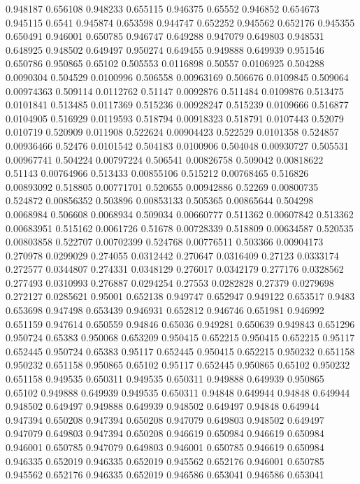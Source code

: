 0.948187 0.656108
0.948233 0.655115
0.946375 0.65552
0.946852 0.654673
0.945115 0.6541
0.945874 0.653598
0.944747 0.652252
0.945562 0.652176
0.945355 0.650491
0.946001 0.650785
0.946747 0.649288
0.947079 0.649803
0.948531 0.648925
0.948502 0.649497
0.950274 0.649455
0.949888 0.649939
0.951546 0.650786
0.950865 0.65102
0.505553 0.0116898
0.50557 0.0106925
0.504288 0.0090304
0.504529 0.0100996
0.506558 0.00963169
0.506676 0.0109845
0.509064 0.00974363
0.509114 0.0112762
0.51147 0.0092876
0.511484 0.0109876
0.513475 0.0101841
0.513485 0.0117369
0.515236 0.00928247
0.515239 0.0109666
0.516877 0.0104905
0.516929 0.0119593
0.518794 0.00918323
0.518791 0.0107443
0.52079 0.010719
0.520909 0.011908
0.522624 0.00904423
0.522529 0.0101358
0.524857 0.00936466
0.52476 0.0101542
0.504183 0.0100906
0.504048 0.00930727
0.505531 0.00967741
0.504224 0.00797224
0.506541 0.00826758
0.509042 0.00818622
0.51143 0.00764966
0.513433 0.00855106
0.515212 0.00768465
0.516826 0.00893092
0.518805 0.00771701
0.520655 0.00942886
0.52269 0.00800735
0.524872 0.00856352
0.503896 0.00853133
0.505365 0.00865644
0.504298 0.0068984
0.506608 0.0068934
0.509034 0.00660777
0.511362 0.00607842
0.513362 0.00683951
0.515162 0.0061726
0.51678 0.00728339
0.518809 0.00634587
0.520535 0.00803858
0.522707 0.00702399
0.524768 0.00776511
0.503366 0.00904173
0.270978 0.0299029
0.274055 0.0312442
0.270647 0.0316409
0.27123 0.0333174
0.272577 0.0344807
0.274331 0.0348129
0.276017 0.0342179
0.277176 0.0328562
0.277493 0.0310993
0.276887 0.0294254
0.27553 0.0282828
0.27379 0.0279698
0.272127 0.0285621
0.95001 0.652138
0.949747 0.652947
0.949122 0.653517
0.9483 0.653698
0.947498 0.653439
0.946931 0.652812
0.946746 0.651981
0.946992 0.651159
0.947614 0.650559
0.94846 0.65036
0.949281 0.650639
0.949843 0.651296
0.950724 0.65383
0.950068 0.653209
0.950415 0.652215
0.950415 0.652215
0.95117 0.652445
0.950724 0.65383
0.95117 0.652445
0.950415 0.652215
0.950232 0.651158
0.950232 0.651158
0.950865 0.65102
0.95117 0.652445
0.950865 0.65102
0.950232 0.651158
0.949535 0.650311
0.949535 0.650311
0.949888 0.649939
0.950865 0.65102
0.949888 0.649939
0.949535 0.650311
0.94848 0.649944
0.94848 0.649944
0.948502 0.649497
0.949888 0.649939
0.948502 0.649497
0.94848 0.649944
0.947394 0.650208
0.947394 0.650208
0.947079 0.649803
0.948502 0.649497
0.947079 0.649803
0.947394 0.650208
0.946619 0.650984
0.946619 0.650984
0.946001 0.650785
0.947079 0.649803
0.946001 0.650785
0.946619 0.650984
0.946335 0.652019
0.946335 0.652019
0.945562 0.652176
0.946001 0.650785
0.945562 0.652176
0.946335 0.652019
0.946586 0.653041
0.946586 0.653041
